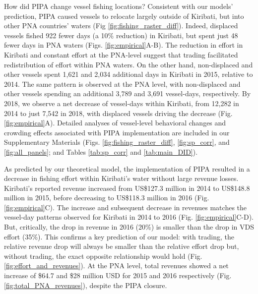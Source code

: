 \documentclass[12pt]{article}
\begin{document}
How did PIPA change vessel fishing locations? Consistent with our models' prediction, PIPA caused vessels to relocate largely outside of Kiribati, but into other PNA countries' waters (Fig \ref{fig:fishing_raster_diff}). Indeed, displaced vessels fished 922 fewer days (a 10\% reduction) in Kiribati, but spent just 48 fewer days in PNA waters (Figs. \ref{fig:empirical}A-B).  The reduction in effort in Kiribati and constant effort at the PNA-level suggest that trading facilitated redistribution of effort within PNA waters. On the other hand, non-displaced and other vessels spent 1,621 and 2,034 additional days in Kiribati in 2015, relative to 2014. The same pattern is observed at the PNA level, with non-displaced and other vessels spending an additional 3,789 and 3,691 vessel-days, respectively. By 2018, we observe a net decrease of vessel-days within Kiribati, from 12,282 in 2014 to just 7,542 in 2018, with displaced vessels driving the decrease (Fig. \ref{fig:empirical}A). Detailed analyses of vessel-level behavioral changes and crowding effects associated with PIPA implementation are included in our Supplementary Materials (Figs. \ref{fig:fishing_raster_diff}, \ref{fig:sp_corr}, and \ref{fig:all_panels}; and Tables \ref{tab:sp_corr} and \ref{tab:main_DID}).

As predicted by our theoretical model, the implementation of PIPA resulted in a decrease in fishing effort within Kiribati's water without large revenue losses. Kiribati's reported revenue increased from US\$127.3 million in 2014 to US\$148.8 million in 2015, before decreasing to US\$118.3 million in 2016 (Fig. \ref{fig:empirical}C).
The increase and subsequent decrease in revenues matches the vessel-day patterns observed for Kiribati in 2014 to 2016 (Fig. \ref{fig:empirical}C-D).
But, critically, the drop in revenue in 2016 (20\%) is smaller than the drop in VDS effort (35\%). This confirms a key prediction of our model: with trading, the relative revenue drop will always be smaller than the relative effort drop but, without trading, the exact opposite relationship would hold (Fig. \ref{fig:effort_and_revenues}).
At the PNA level, total revenues showed a net increase of \$64.7 and \$28 million USD for 2015 and 2016 respectively (Fig. \ref{fig:total_PNA_revenues}), despite the PIPA closure.
\end{document}
